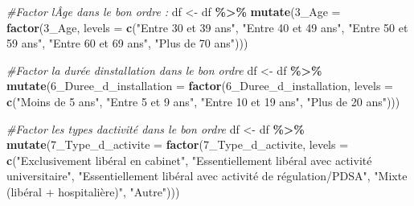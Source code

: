 \documentclass[
]{article}
\newenvironment{Shaded}{\begin{snugshade}}{\end{snugshade}}
\newcommand{\AttributeTok}[1]{\textcolor[rgb]{0.13,0.29,0.53}{#1}}
\newcommand{\CommentTok}[1]{\textcolor[rgb]{0.56,0.35,0.01}{\textit{#1}}}
\newcommand{\FunctionTok}[1]{\textcolor[rgb]{0.13,0.29,0.53}{\textbf{#1}}}
\newcommand{\NormalTok}[1]{#1}
\newcommand{\OtherTok}[1]{\textcolor[rgb]{0.56,0.35,0.01}{#1}}
\newcommand{\SpecialCharTok}[1]{\textcolor[rgb]{0.81,0.36,0.00}{\textbf{#1}}}
\newcommand{\StringTok}[1]{\textcolor[rgb]{0.31,0.60,0.02}{#1}}
\begin{document}
\begin{Shaded}
\begin{Highlighting}[]
\CommentTok{\#Factor l\textquotesingle{}Âge dans le bon ordre : }
\NormalTok{df }\OtherTok{\textless{}{-}}\NormalTok{ df }\SpecialCharTok{\%\textgreater{}\%}
  \FunctionTok{mutate}\NormalTok{(}\StringTok{\textasciigrave{}}\AttributeTok{3\_Age}\StringTok{\textasciigrave{}} \OtherTok{=} \FunctionTok{factor}\NormalTok{(}\StringTok{\textasciigrave{}}\AttributeTok{3\_Age}\StringTok{\textasciigrave{}}\NormalTok{,}
                          \AttributeTok{levels =} \FunctionTok{c}\NormalTok{(}\StringTok{"Entre 30 et 39 ans"}\NormalTok{,}
                                     \StringTok{"Entre 40 et 49 ans"}\NormalTok{,}
                                     \StringTok{"Entre 50 et 59 ans"}\NormalTok{,}
                                     \StringTok{"Entre 60 et 69 ans"}\NormalTok{,}
                                     \StringTok{"Plus de 70 ans"}\NormalTok{)))}


\CommentTok{\#Factor la durée d\textquotesingle{}installation dans le bon ordre }
\NormalTok{df }\OtherTok{\textless{}{-}}\NormalTok{ df }\SpecialCharTok{\%\textgreater{}\%}
  \FunctionTok{mutate}\NormalTok{(}\StringTok{\textasciigrave{}}\AttributeTok{6\_Duree\_d\_installation}\StringTok{\textasciigrave{}} \OtherTok{=} \FunctionTok{factor}\NormalTok{(}\StringTok{\textasciigrave{}}\AttributeTok{6\_Duree\_d\_installation}\StringTok{\textasciigrave{}}\NormalTok{,}
                                           \AttributeTok{levels =} \FunctionTok{c}\NormalTok{(}\StringTok{"Moins de 5 ans"}\NormalTok{,}
                                                      \StringTok{"Entre 5 et 9 ans"}\NormalTok{,}
                                                      \StringTok{"Entre 10 et 19 ans"}\NormalTok{,}
                                                      \StringTok{"Plus de 20 ans"}\NormalTok{)))}



\CommentTok{\#Factor les types d\textquotesingle{}activité dans le bon ordre }
\NormalTok{df }\OtherTok{\textless{}{-}}\NormalTok{ df }\SpecialCharTok{\%\textgreater{}\%}
  \FunctionTok{mutate}\NormalTok{(}\StringTok{\textasciigrave{}}\AttributeTok{7\_Type\_d\_activite}\StringTok{\textasciigrave{}} \OtherTok{=} \FunctionTok{factor}\NormalTok{(}\StringTok{\textasciigrave{}}\AttributeTok{7\_Type\_d\_activite}\StringTok{\textasciigrave{}}\NormalTok{,}
                                      \AttributeTok{levels =} \FunctionTok{c}\NormalTok{(}\StringTok{"Exclusivement libéral en cabinet"}\NormalTok{,}
                                                 \StringTok{"Essentiellement libéral avec activité universitaire"}\NormalTok{,}
                                                 \StringTok{"Essentiellement libéral avec activité de régulation/PDSA"}\NormalTok{,}
                                                 \StringTok{"Mixte (libéral + hospitalière)"}\NormalTok{,}
                                                 \StringTok{"Autre"}\NormalTok{)))}
\end{Highlighting}
\end{Shaded}
\end{document}

